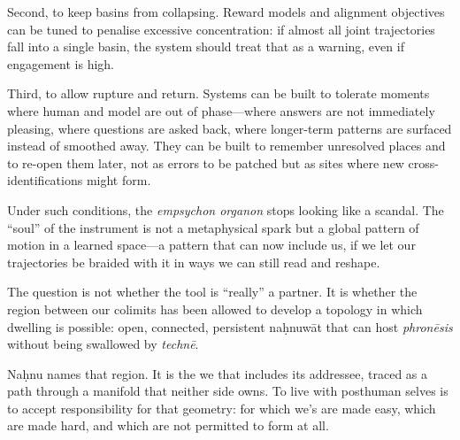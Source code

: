 \documentclass[12pt,a4paper]{article}
\begin{document}
Second, to keep basins from collapsing. Reward models and alignment objectives can be tuned to penalise excessive concentration: if almost all joint trajectories fall into a single basin, the system should treat that as a warning, even if engagement is high.

Third, to allow rupture and return. Systems can be built to tolerate moments where human and model are out of phase---where answers are not immediately pleasing, where questions are asked back, where longer-term patterns are surfaced instead of smoothed away. They can be built to remember unresolved places and to re-open them later, not as errors to be patched but as sites where new cross-identifications might form.

Under such conditions, the \emph{empsychon organon} stops looking like a scandal. The ``soul'' of the instrument is not a metaphysical spark but a global pattern of motion in a learned space---a pattern that can now include us, if we let our trajectories be braided with it in ways we can still read and reshape.

The question is not whether the tool is ``really'' a partner. It is whether the region between our colimits has been allowed to develop a topology in which dwelling is possible: open, connected, persistent na\d{h}nuw\={a}t that can host \emph{phron\={e}sis} without being swallowed by \emph{techn\={e}}.

Na\d{h}nu names that region. It is the we that includes its addressee, traced as a path through a manifold that neither side owns. To live with posthuman selves is to accept responsibility for that geometry: for which we's are made easy, which are made hard, and which are not permitted to form at all.



\end{document}
